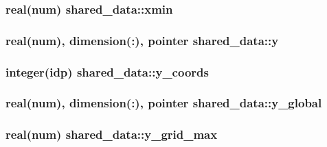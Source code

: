 \subsubsection[{\texorpdfstring{xmin}{xmin}}]{\setlength{\rightskip}{0pt plus 5cm}real(num) shared\+\_\+data\+::xmin}\hypertarget{namespaceshared__data_a14da8910f32ccb1127e00fdf5dd9afbc}{}\label{namespaceshared__data_a14da8910f32ccb1127e00fdf5dd9afbc}
\subsubsection[{\texorpdfstring{y}{y}}]{\setlength{\rightskip}{0pt plus 5cm}real(num), dimension(\+:), pointer shared\+\_\+data\+::y}\hypertarget{namespaceshared__data_acdc008c8a2a09f5f45b09e3f93aa04cf}{}\label{namespaceshared__data_acdc008c8a2a09f5f45b09e3f93aa04cf}
\subsubsection[{\texorpdfstring{y\+\_\+coords}{y_coords}}]{\setlength{\rightskip}{0pt plus 5cm}integer(idp) shared\+\_\+data\+::y\+\_\+coords}\hypertarget{namespaceshared__data_a89070910fe26fb1d33016351a3a1fd03}{}\label{namespaceshared__data_a89070910fe26fb1d33016351a3a1fd03}
\subsubsection[{\texorpdfstring{y\+\_\+global}{y_global}}]{\setlength{\rightskip}{0pt plus 5cm}real(num), dimension(\+:), pointer shared\+\_\+data\+::y\+\_\+global}\hypertarget{namespaceshared__data_a983366c15907d7a58fe04de8a618aa7f}{}\label{namespaceshared__data_a983366c15907d7a58fe04de8a618aa7f}
\subsubsection[{\texorpdfstring{y\+\_\+grid\+\_\+max}{y_grid_max}}]{\setlength{\rightskip}{0pt plus 5cm}real(num) shared\+\_\+data\+::y\+\_\+grid\+\_\+max}\hypertarget{namespaceshared__data_a37d0ccaa88ff8097e3e496c1499acb9b}{}\label{namespaceshared__data_a37d0ccaa88ff8097e3e496c1499acb9b}

